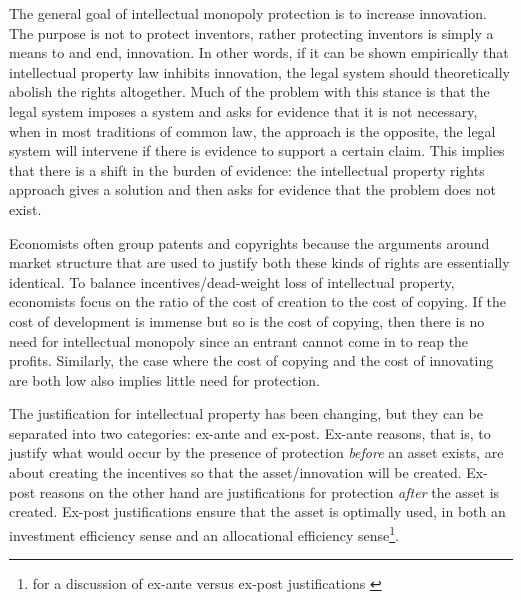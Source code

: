 The general goal of intellectual monopoly protection is to increase innovation. The purpose is not to protect inventors, rather protecting inventors is simply a means to and end, innovation. In other words, if it can be shown empirically that intellectual property law inhibits innovation, the legal system should theoretically abolish the rights altogether. Much of the problem with this stance is that the legal system imposes a system and asks for evidence that it is not necessary, when in most traditions of common law, the approach is the opposite, the legal system will intervene if there is evidence to support a certain claim. This implies that there is a shift in the burden of evidence: the intellectual property rights approach gives a solution and then asks for evidence that the problem does not exist. 


Economists often group patents and copyrights because the arguments around market structure that are used to justify both these kinds of rights are essentially identical. To balance incentives/dead-weight loss of intellectual property, economists focus on the ratio of the cost of creation to the cost of copying. If the cost of development is immense but so is the cost of copying, then there is no need for intellectual monopoly since an entrant cannot come in to reap the profits. Similarly, the case where the cost of copying and the cost of innovating are both low also implies little need for protection. 


The justification for intellectual property has been changing, but they can be separated into two categories: ex-ante and ex-post. Ex-ante reasons, that is, to justify what would occur by the presence of protection \textit{before} an asset exists, are about creating the incentives so that the asset/innovation will be created. Ex-post reasons on the other hand are justifications for protection \textit{after} the asset is created. Ex-post justifications ensure that the asset is optimally used, in both an investment efficiency sense and an allocational efficiency sense\footnote{for a discussion of ex-ante versus ex-post justifications \cite{Lemleyt2004}}.

